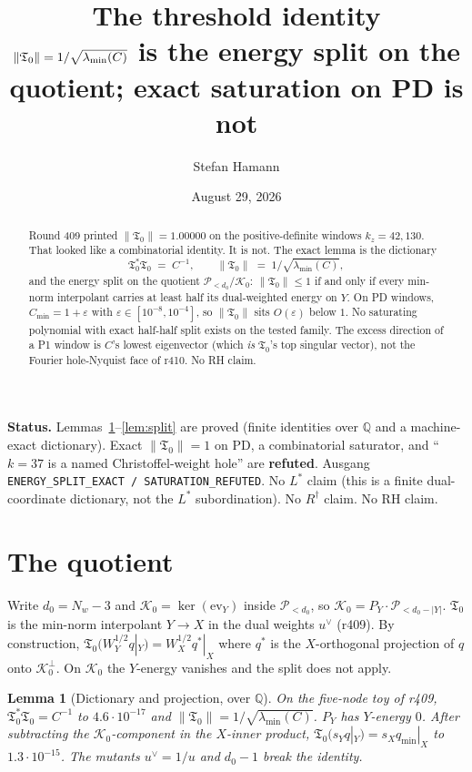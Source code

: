 \documentclass[11pt]{article}
\title{\bfseries The threshold identity\\[2mm]
\large $\|\Tfrak_0\|=1/\sqrt{\lambda_{\min}(C)}$ is the energy
split on the quotient; exact saturation on PD is not}
\author{Stefan Hamann}
\date{August 29, 2026}
\newtheorem{lemma}{Lemma}
\theoremstyle{remark}
\newcommand{\Tfrak}{\mathfrak{T}}
\begin{document}
\maketitle

\begin{abstract}\noindent
Round 409 printed $\|\Tfrak_0\|=1.00000$ on the
positive-definite windows $k_z=42,130$.
That looked like a combinatorial identity.
It is not.
The exact lemma is the dictionary
\[
  \Tfrak_0^*\Tfrak_0 \;=\; C^{-1},
  \qquad
  \|\Tfrak_0\| \;=\; 1/\sqrt{\lambda_{\min}(C)},
\]
and the energy split on the quotient
$\mathcal{P}_{<d_0}/\mathcal{K}_0$:
$\|\Tfrak_0\|\le 1$ if and only if every min-norm interpolant
carries at least half its dual-weighted energy on $Y$.
On PD windows, $C_{\min}=1+\varepsilon$ with
$\varepsilon\in[10^{-8},10^{-4}]$, so $\|\Tfrak_0\|$ sits
$O(\varepsilon)$ below $1$.
No saturating polynomial with exact half-half split exists
on the tested family.
The excess direction of a P1 window is $C$'s lowest
eigenvector (which \emph{is} $\Tfrak_0$'s top singular vector),
not the Fourier hole-Nyquist face of r410.
No RH claim.
\end{abstract}

\medskip\noindent
\textbf{Status.}\enspace
Lemmas~\ref{lem:dict}--\ref{lem:split} are proved
(finite identities over $\mathbb{Q}$ and a machine-exact
dictionary).
Exact $\|\Tfrak_0\|=1$ on PD, a combinatorial saturator,
and ``$k=37$ is a named Christoffel-weight hole'' are
\textbf{refuted}.
Ausgang \texttt{ENERGY\_SPLIT\_EXACT / SATURATION\_REFUTED}.
No $L^*$ claim (this is a finite dual-coordinate
dictionary, not the $L^*$ subordination).
No $R^\dagger$ claim.  No RH claim.

\section{The quotient}

Write $d_0=N_w-3$ and $\mathcal{K}_0=\ker(\mathrm{ev}_Y)$
inside $\mathcal{P}_{<d_0}$, so
$\mathcal{K}_0=P_Y\cdot\mathcal{P}_{<d_0-|Y|}$.
$\Tfrak_0$ is the min-norm interpolant $Y\to X$ in the
dual weights $u^\vee$ (r409).
By construction,
$\Tfrak_0(W_Y^{1/2}q|_Y)=W_X^{1/2}q^*|_X$ where $q^*$ is
the $X$-orthogonal projection of $q$ onto $\mathcal{K}_0^\perp$.
On $\mathcal{K}_0$ the $Y$-energy vanishes and the split
does not apply.

\begin{lemma}[Dictionary and projection, over $\mathbb{Q}$]
\label{lem:dict}
On the five-node toy of r409, $\Tfrak_0^*\Tfrak_0=C^{-1}$
to $4.6\cdot 10^{-17}$ and
$\|\Tfrak_0\|=1/\sqrt{\lambda_{\min}(C)}$.
$P_Y$ has $Y$-energy $0$.
After subtracting the $\mathcal{K}_0$-component in the
$X$-inner product, $\Tfrak_0(s_Y q|_Y)=s_X q_{\min}|_X$
to $1.3\cdot 10^{-15}$.
The mutants $u^\vee=1/u$ and $d_0-1$ break the identity.
\end{lemma}
\end{document}
